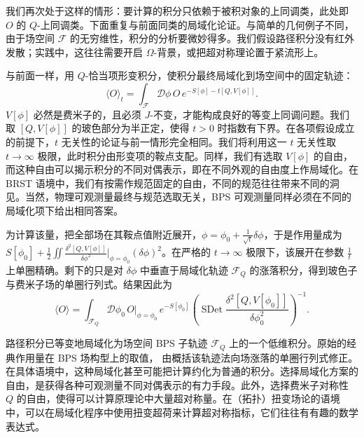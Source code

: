 我们再次处于这样的情形：要计算的积分只依赖于被积对象的上同调类，此处即 $O$ 的 $Q$-上同调类。下面重复与前面同类的局域化论证。与简单的几何例子不同，由于场空间 $\mathcal{F}$ 的无穷维性，积分的分析要微妙得多。我们假设路径积分没有红外发散；实践中，这往往需要开启 $\Omega$-背景，或把超对称理论置于紧流形上。

与前面一样，用 $Q$-恰当项形变积分，使积分最终局域化到场空间中的固定轨迹：
\begin{equation}\tag{A.8}
\langle O\rangle_t = \int_{\mathcal{F}}\mathcal{D}\phi\, O\, e^{-S[\phi]-t[Q,V[\phi]]}.
\end{equation}
$V[\phi]$ 必然是费米子的，且必须 $J$-不变，才能构成良好的等变上同调问题。我们取 $[Q,V[\phi]]$ 的玻色部分为半正定，使得 $t>0$ 时指数有下界。在各项假设成立的前提下，$t$ 无关性的论证与前一情形完全相同。我们将利用这一 $t$ 无关性取 $t\to\infty$ 极限，此时积分由形变项的鞍点支配。同样，我们有选取 $V[\phi]$ 的自由，而这种自由可以揭示积分的不同对偶表示，即在不同外观的自由度上作局域化。在 BRST 语境中，我们有按需作规范固定的自由，不同的规范往往带来不同的洞见。当然，物理可观测量最终与规范选取无关，BPS 可观测量同样必须在不同的局域化项下给出相同答案。

为计算该量，把全部场在其鞍点值附近展开，$\phi=\phi_0+\frac{1}{\sqrt{t}}\delta\phi$，于是作用量成为 $S[\phi_0]+\frac{1}{2}\iint\frac{\delta^2[Q,V[\phi]]}{\delta\phi^2}\big|_{\phi=\phi_0}(\delta\phi)^2$。在严格的 $t\to\infty$ 极限下，该展开在参数 $\frac{1}{t}$ 上单圈精确。剩下的只是对 $\delta\phi$ 中垂直于局域化轨迹 $\mathcal{F}_Q$ 的涨落积分，得到玻色子与费米子场的单圈行列式。结果因此为
\begin{equation}\tag{A.9}
\langle O\rangle = \int_{\mathcal{F}_Q}\mathcal{D}\phi_0\, O|_{\phi=\phi_0}\, e^{-S[\phi_0]}\left(\operatorname{SDet}\frac{\delta^2[Q,V[\phi_0]]}{\delta\phi_0^2}\right)^{-1}.
\end{equation}

路径积分已等变地局域化为场空间 BPS 子轨迹 $\mathcal{F}_Q$ 上的一个低维积分。原始的经典作用量在 BPS 场构型上的取值，
由概括该轨迹法向场涨落的单圈行列式修正。在具体语境中，这种局域化甚至可能把计算约化为普通的积分。选择局域化方案的自由，是获得各种可观测量不同对偶表示的有力手段。此外，选择费米子对称性 $Q$ 的自由，使得可以计算原理论中大量超对称量。在（拓扑）扭变场论的语境中，可以在局域化程序中使用扭变超荷来计算超对称指标，它们往往有有趣的数学表达式。

